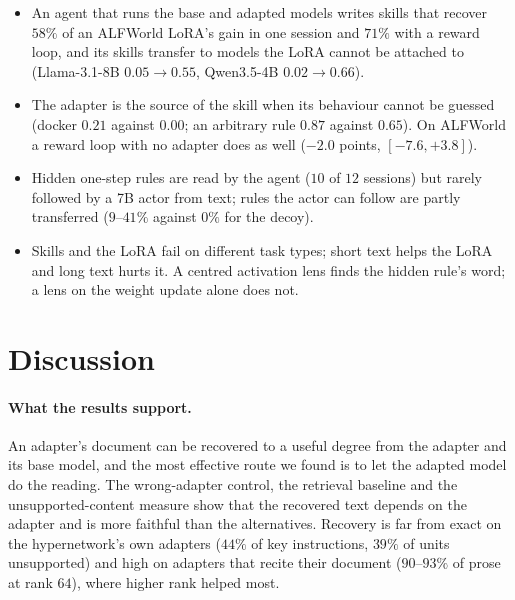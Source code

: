 \documentclass[11pt]{article}
\begin{document}
\begin{findings}
\begin{itemize}
\item An agent that runs the base and adapted models writes skills that recover $58\%$ of an ALFWorld LoRA's gain in one session and $71\%$ with a reward
loop, and its skills transfer to models the LoRA cannot be attached to (Llama-3.1-8B $0.05\to0.55$, Qwen3.5-4B $0.02\to0.66$).
\item The adapter is the source of the skill when its behaviour cannot be guessed (docker $0.21$ against $0.00$; an arbitrary rule $0.87$ against $0.65$).
On ALFWorld a reward loop with no adapter does as well ($-2.0$ points, $[-7.6,+3.8]$).
\item Hidden one-step rules are read by the agent ($10$ of $12$ sessions) but rarely followed by a 7B actor from text; rules the actor can follow are
partly transferred ($9$--$41\%$ against $0\%$ for the decoy).
\item Skills and the LoRA fail on different task types; short text helps the LoRA and long text hurts it. A centred activation lens finds the hidden
rule's word; a lens on the weight update alone does not.
\end{itemize}
\end{findings}

\section{Discussion}
\label{sec:discussion}

\paragraph{What the results support.} An adapter's document can be recovered to a useful degree from the adapter and its base model, and the
most effective route we found is to let the adapted model do the reading. The wrong-adapter control, the retrieval baseline and the
unsupported-content measure show that the recovered text depends on the adapter and is more faithful than the alternatives. Recovery is far from
exact on the hypernetwork's own adapters ($44\%$ of key instructions, $39\%$ of units unsupported) and high on adapters that recite their document
($90$--$93\%$ of prose at rank $64$), where higher rank helped most.
\end{document}
